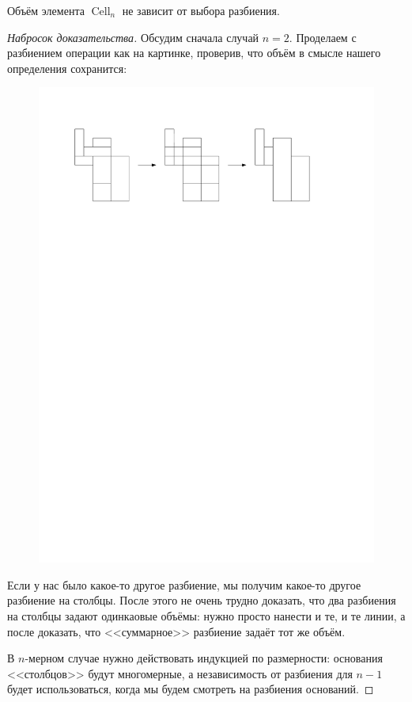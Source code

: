 \documentclass{notes}
\DeclareMathOperator{\Cell}{Cell}
\begin{document}
	\begin{st}[Корректность]
		Объём элемента $\Cell_n$ не зависит от выбора разбиения.
		\begin{proof}[Набросок доказательства]
			Обсудим сначала случай $n = 2$. Проделаем с разбиением операции как на картинке, проверив, что объём в смысле нашего определения сохранится: 
			\begin{figure}[h]
				\begin{center}
					\includegraphics[scale = 0.5]{rects.pdf}
				\end{center}
			\end{figure}

			Если у нас было какое-то другое разбиение, мы получим какое-то другое разбиение на столбцы. После этого не очень трудно доказать, что два разбиения на столбцы задают одинкаовые объёмы: нужно просто нанести и те, и те линии, а после доказать, что <<суммарное>> разбиение задаёт тот же объём.

			В $n$-мерном случае нужно действовать индукцией по размерности: основания <<столбцов>> будут многомерные, а независимость от разбиения для $n-1$ будет использоваться, когда мы будем смотреть на разбиения оснований.
 		\end{proof}
	\end{st}
\end{document}
